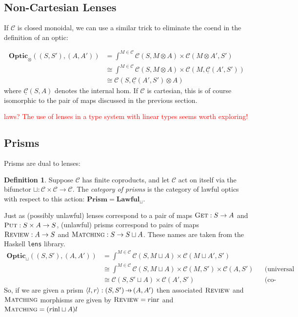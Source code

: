 \documentclass[11pt,a4paper]{article}
\theoremstyle{plain}
\theoremstyle{definition}
\newtheorem{definition}[theorem]{Definition}
\newcommand{\C}{\mathscr{C}}
\newcommand{\homC}{\underline{\C}}
\newcommand{\Optic}{\mathbf{Optic}}
\newcommand{\Lawful}{\mathbf{Lawful}}
\newcommand{\Prism}{\mathbf{Prism}}
\newcommand{\inl}{\mathrm{inl}}
\newcommand{\inr}{\mathrm{inr}}
\newcommand{\fget}{\textsc{Get}}
\newcommand{\fput}{\textsc{Put}}
\newcommand{\freview}{\textsc{Review}}
\newcommand{\fmatching}{\textsc{Matching}}
\newcommand{\hto}{\ensuremath{\,\mathaccent\shortmid\rightarrow\,}}
\newcommand{\todo}[1]{\textcolor{red}{\small #1}}
\begin{document}
\subsection{Non-Cartesian Lenses}
If $\C$ is closed monoidal, we can use a similar trick to eliminate the coend in the definition of an optic:

\begin{align*}
\Optic_\otimes((S, S'), (A, A')) &= \int^{M \in \C} \C(S, M \otimes A) \times \C(M \otimes A', S') \\
&\cong \int^{M \in \C} \C(S, M \otimes A) \times \C(M, \homC(A',S')) \\
&\cong \C(S, \homC(A',S') \otimes A)
\end{align*}
where $\homC(S, A)$ denotes the internal hom. If $\C$ is cartesian, this is of course isomorphic to the pair of maps discussed in the previous section. 

\todo{laws?}
\todo{The use of lenses in a type system with linear types seems worth exploring!}

\subsection{Prisms}
Prisms are dual to lenses:

\begin{definition}
Suppose $\C$ has finite coproducts, and let $\C$ act on itself via the bifunctor $\sqcup : \C \times \C \to \C$. The \emph{category of prisms} is the category of lawful optics with respect to this action: $\Prism = \Lawful_\sqcup$.
\end{definition}

Just as (possibly unlawful) lenses correspond to a pair of maps $\fget : S \to A$ and $\fput : S \times A \to S$, (unlawful) prisms correspond to pairs of maps $\freview : A \to S$ and $\fmatching : S \to S \sqcup A$. These names are taken from the Haskell \texttt{lens} library.
\begin{align*}
\Optic_\sqcup((S, S'), (A, A')) &= \int^{M \in \C} \C(S, M \sqcup A) \times \C(M \sqcup A', S') \\
&\cong \int^{M \in \C} \C(S, M \sqcup A) \times \C(M, S') \times \C(A, S') && \text{(universal property of coproduct)} \\
&\cong \C(S, S' \sqcup A) \times \C(A', S') && \text{(co-Yoneda)}
\end{align*}
So, if we are given a prism $\langle l, r \rangle : (S, S') \hto (A, A')$ then associated $\freview$ and $\fmatching$ morphisms are given by $\freview = r \inr$ and $\fmatching = (r\inl \sqcup A)l$
\end{document}
